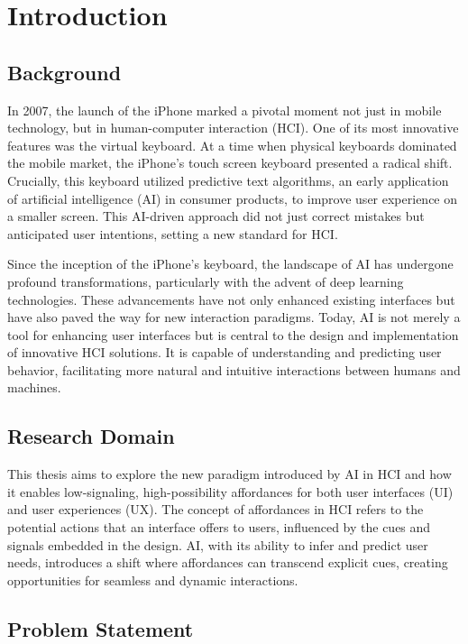 
\section{Introduction}

\subsection{Background}

In 2007, the launch of the iPhone marked a pivotal moment not just in mobile technology, but in human-computer interaction (HCI).
One of its most innovative features was the virtual keyboard. At a time when physical keyboards dominated the mobile market, the iPhone’s touch screen keyboard presented a radical shift.
Crucially, this keyboard utilized predictive text algorithms, an early application of artificial intelligence (AI) in consumer products, to improve user experience on a smaller screen.
This AI-driven approach did not just correct mistakes but anticipated user intentions, setting a new standard for HCI.

Since the inception of the iPhone's keyboard, the landscape of AI has undergone profound transformations, particularly with the advent of deep learning technologies.
These advancements have not only enhanced existing interfaces but have also paved the way for new interaction paradigms.
Today, AI is not merely a tool for enhancing user interfaces but is central to the design and implementation of innovative HCI solutions.
It is capable of understanding and predicting user behavior, facilitating more natural and intuitive interactions between humans and machines.

\subsection{Research Domain}

This thesis aims to explore the new paradigm introduced by AI in HCI and how it enables low-signaling, high-possibility affordances for both user interfaces (UI) and user experiences (UX).
The concept of affordances in HCI refers to the potential actions that an interface offers to users, influenced by the cues and signals embedded in the design.
AI, with its ability to infer and predict user needs, introduces a shift where affordances can transcend explicit cues, creating opportunities for seamless and dynamic interactions.

\subsection{Problem Statement}

